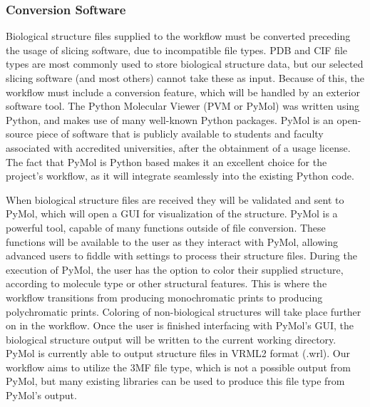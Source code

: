 \documentclass[letterpaper, onecolumn, draftclsnofoot, 10pt, compsoc]{IEEEtran}
\begin{document}
\begin{singlespace}
        \subsubsection{Conversion Software}
        Biological structure files supplied to the workflow must be converted preceding the usage of slicing software, due to incompatible file types.
        PDB and CIF file types are most commonly used to store biological structure data, but our selected slicing software (and most others) cannot take these as input.
        Because of this, the workflow must include a conversion feature, which will be handled by an exterior software tool.
        The Python Molecular Viewer (PVM or PyMol) was written using Python, and makes use of many well-known Python packages. \cite{pymol}
        PyMol is an open-source piece of software that is publicly available to students and faculty associated with accredited universities, after the obtainment of a usage license.
        The fact that PyMol is Python based makes it an excellent choice for the project's workflow, as it will integrate seamlessly into the existing Python code.\par
        
        When biological structure files are received they will be validated and sent to PyMol, which will open a GUI for visualization of the structure.
        PyMol is a powerful tool, capable of many functions outside of file conversion.
        These functions will be available to the user as they interact with PyMol, allowing advanced users to fiddle with settings to process their structure files.
        During the execution of PyMol, the user has the option to color their supplied structure, according to molecule type or other structural features.
        This is where the workflow transitions from producing monochromatic prints to producing polychromatic prints.
        Coloring of non-biological structures will take place further on in the workflow. 
        Once the user is finished interfacing with PyMol's GUI, the biological structure output will be written to the current working directory. 
        PyMol is currently able to output structure files in VRML2 format (.wrl).\cite{pymolFormats}
        Our workflow aims to utilize the 3MF file type, which is not a possible output from PyMol, but many existing libraries can be used to produce this file type from PyMol's output.
        

\end{singlespace}
\end{document}
